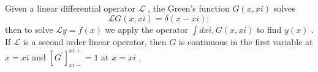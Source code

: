 Given a linear differential operator
 $ \mathcal{L} $ , the Green's function  $ G(x, xi) $  solves
 \[ \mathcal{L} G(x, xi)= \delta (x- xi); \] then to solve
 $  \mathcal{L} y=f(x) $  we apply the operator  $  \int d xi , G(x, xi) $  to
find  $ y(x) $ . If  $  \mathcal{L} $  is a second order linear
operator, then  $ G $  is continuous in the first variable at  $ x= xi $  and
 $ [G ^{\prime} ]_{ xi-}^{ xi+}=1 $  at  $ x= xi $ .


